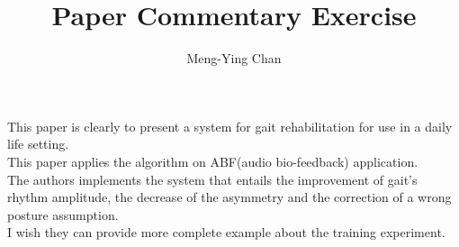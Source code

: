 \documentclass[a4paper]{article}
\title{Paper Commentary Exercise}
\author{Meng-Ying Chan}
\begin{document}
\maketitle

This paper \cite{Casamassima:2013:WAS:2494091.2494178} is clearly to present a system for gait rehabilitation for use in a daily life setting. \\

This paper applies the algorithm on ABF(audio bio-feedback) application.\\

The authors implements the system that entails the improvement of gait's rhythm amplitude, the decrease of the asymmetry and the correction of a wrong posture assumption.\\

I wish they can provide more complete example about the training experiment. 




\end{document}
